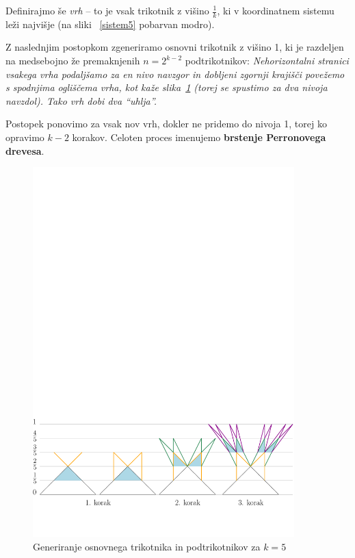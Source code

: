 \documentclass[a4paper, 12pt]{article}
\begin{document}
Definirajmo še \emph{vrh} -- to je vsak trikotnik z višino $ \frac{1}{k} $, ki v koordinatnem sistemu leži najvišje (na sliki ~\ref{sistem5} pobarvan modro).

Z naslednjim postopkom zgeneriramo osnovni trikotnik z višino 1, ki je razdeljen na medsebojno že premaknjenih $ n = 2^{k-2} $ podtrikotnikov: \emph{Nehorizontalni stranici vsakega vrha podaljšamo za en nivo navzgor in dobljeni zgornji krajišči povežemo s spodnjima ogliščema vrha, kot kaže slika~\ref{koraki} (torej se spustimo za dva nivoja navzdol). Tako vrh dobi dva ``uhlja''.}

Postopek ponovimo za vsak nov vrh, dokler ne pridemo do nivoja 1, torej ko opravimo $ k-2 $ korakov. Celoten proces imenujemo \textbf{brstenje Perronovega drevesa}.

\begin{figure}[h!]
    \centering
    \includegraphics[width=0.9\textwidth]{ipe_slike/koraki.pdf}
    \caption{Generiranje osnovnega trikotnika in podtrikotnikov za $ k = 5 $}
    \label{koraki}
\end{figure}
\end{document}
